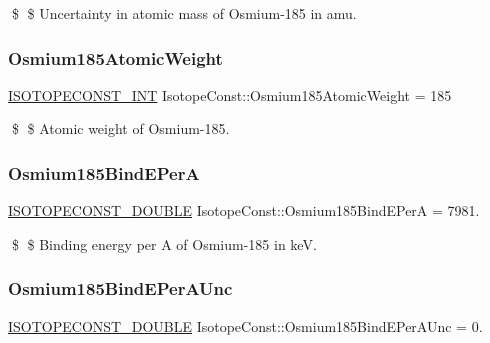 \$ \$ Uncertainty in atomic mass of Osmium-\/185 in amu. \mbox{\label{group___isotope_const-_osmium-_os185_gaa31f8c332a8f94d2d04741ec7ce020df}} 
\subsubsection{\texorpdfstring{Osmium185\+Atomic\+Weight}{Osmium185AtomicWeight}}
{\footnotesize\ttfamily \mbox{\hyperlink{group___isotope_const-_macros_ga5f18360b3e99483a35c32d789e62621c}{I\+S\+O\+T\+O\+P\+E\+C\+O\+N\+S\+T\+\_\+\+I\+NT}} Isotope\+Const\+::\+Osmium185\+Atomic\+Weight = 185}

\$ \$ Atomic weight of Osmium-\/185. \mbox{\label{group___isotope_const-_osmium-_os185_gadb80beb6d2ad02888fededb462b0f8d2}} 
\subsubsection{\texorpdfstring{Osmium185\+Bind\+E\+PerA}{Osmium185BindEPerA}}
{\footnotesize\ttfamily \mbox{\hyperlink{group___isotope_const-_macros_ga8f45a7272ce02c0b4c65c44636ed719a}{I\+S\+O\+T\+O\+P\+E\+C\+O\+N\+S\+T\+\_\+\+D\+O\+U\+B\+LE}} Isotope\+Const\+::\+Osmium185\+Bind\+E\+PerA = 7981.}

\$ \$ Binding energy per A of Osmium-\/185 in keV. \mbox{\label{group___isotope_const-_osmium-_os185_gaa9530cadefd69c906741bf3fb1c317c1}} 
\subsubsection{\texorpdfstring{Osmium185\+Bind\+E\+Per\+A\+Unc}{Osmium185BindEPerAUnc}}
{\footnotesize\ttfamily \mbox{\hyperlink{group___isotope_const-_macros_ga8f45a7272ce02c0b4c65c44636ed719a}{I\+S\+O\+T\+O\+P\+E\+C\+O\+N\+S\+T\+\_\+\+D\+O\+U\+B\+LE}} Isotope\+Const\+::\+Osmium185\+Bind\+E\+Per\+A\+Unc = 0.}

